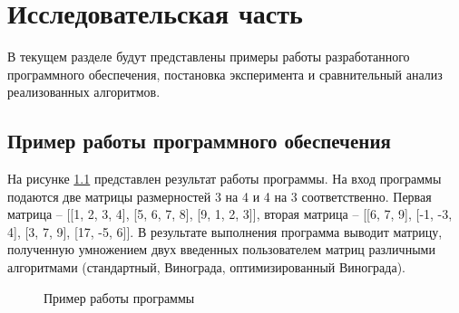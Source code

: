 \chapter{Исследовательская часть}
В текущем разделе будут представлены примеры работы разработанного программного обеспечения, постановка эксперимента и сравнительный анализ реализованных алгоритмов.

\section{Пример работы программного обеспечения}

На рисунке \ref{fig:prog_exmpl} представлен результат работы программы.
На вход программы подаются две матрицы размерностей 3 на 4 и 4 на 3 соответственно.
Первая матрица -- [[1, 2, 3, 4], [5, 6, 7, 8], [9, 1, 2, 3]], вторая матрица -- [[6, 7, 9], [-1, -3, 4], [3, 7, 9], [17, -5, 6]].
В результате выполнения программа выводит матрицу, полученную умножением двух введенных пользователем матриц различными алгоритмами (стандартный, Винограда, оптимизированный Винограда).

\begin{figure}[h!]
	
	
	\caption{Пример работы программы}
	
	\label{fig:prog_exmpl}
	
\end{figure}

